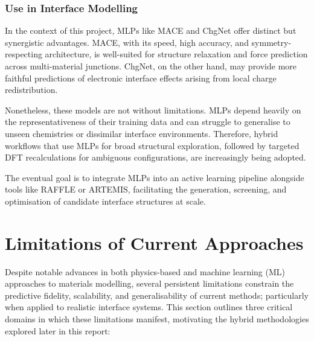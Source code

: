 \subsubsection{Use in Interface Modelling}

In the context of this project, MLPs like MACE and ChgNet offer distinct but synergistic advantages. MACE, with its
speed, high accuracy, and symmetry-respecting architecture, is well-suited for structure relaxation and force
prediction across multi-material junctions. ChgNet, on the other hand, may provide more faithful predictions of
electronic interface effects arising from local charge redistribution.

Nonetheless, these models are not without limitations. MLPs depend heavily on the representativeness of their training
data and can struggle to generalise to unseen chemistries or dissimilar interface environments. Therefore, hybrid
workflows that use MLPs for broad structural exploration, followed by targeted DFT recalculations for ambiguous
configurations, are increasingly being adopted.

The eventual goal is to integrate MLPs into an active learning pipeline alongside tools like RAFFLE or ARTEMIS,
facilitating the generation, screening, and optimisation of candidate interface structures at scale.


\section{Limitations of Current Approaches}
\label{section:limitations}

Despite notable advances in both physics-based and machine learning (ML) approaches to materials modelling, several
persistent limitations constrain the predictive fidelity, scalability, and generalisability of current methods;
particularly when applied to realistic interface systems. This section outlines three critical domains in which these
limitations manifest, motivating the hybrid methodologies explored later in this report:

